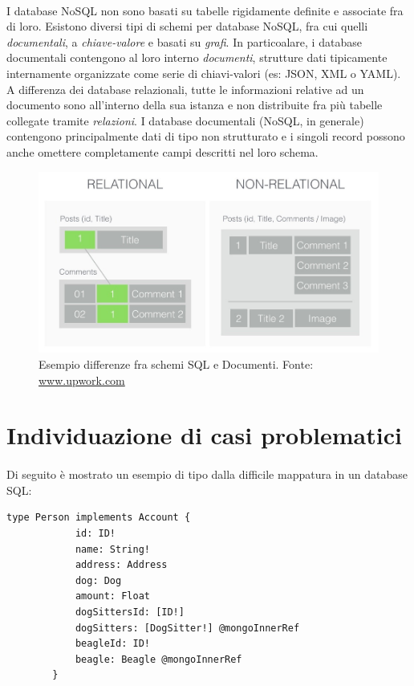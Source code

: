 \documentclass[a4paper, 12pt]{report}
\begin{document}
    \paragraph*{}
      I database NoSQL non sono basati su tabelle rigidamente definite e associate fra di loro.
      Esistono diversi tipi di schemi per database NoSQL, fra cui quelli \emph{documentali}, a \emph{chiave-valore} e basati su \emph{grafi}.
      In particoalare, i database documentali contengono al loro interno \emph{documenti}, strutture dati tipicamente internamente organizzate come serie di chiavi-valori (es: JSON, XML o YAML).
      A differenza dei database relazionali, tutte le informazioni relative ad un documento sono all'interno della sua istanza e non distribuite fra più tabelle collegate tramite \emph{relazioni}.
      I database documentali (NoSQL, in generale) contengono principalmente dati di tipo non strutturato e i singoli record possono anche omettere completamente campi descritti nel loro schema.
      \begin{figure}[H]
        \includegraphics[width=\textwidth]{relational-documental.jpg}
        \caption{Esempio differenze fra schemi SQL e Documenti. Fonte: \href{https://www.upwork.com/resources/sql-vs-nosql-databases-whats-the-difference/}{www.upwork.com}}
      \end{figure}
    \section{Individuazione di casi problematici}
    \paragraph*{}
    Di seguito è mostrato un esempio di tipo dalla difficile mappatura in un database SQL:
      \begin{Verbatim}[samepage=true]
        type Person implements Account {
            id: ID!
            name: String!
            address: Address
            dog: Dog
            amount: Float
            dogSittersId: [ID!]
            dogSitters: [DogSitter!] @mongoInnerRef
            beagleId: ID!
            beagle: Beagle @mongoInnerRef
        }
      \end{Verbatim}
\end{document}
